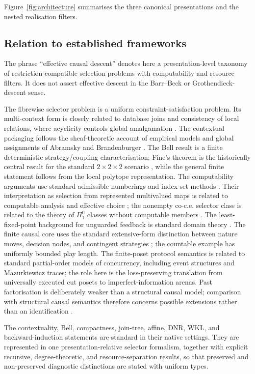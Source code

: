 \documentclass[11pt]{article}
\theoremstyle{plain}
\theoremstyle{definition}
\theoremstyle{remark}
\begin{document}
Figure~\ref{fig:architecture} summarises the three canonical presentations and the nested realisation filters.

\subsection*{Relation to established frameworks}

The phrase ``effective causal descent'' denotes here a presentation-level
taxonomy of restriction-compatible selection problems with computability and
resource filters. It does not assert effective descent in the Barr--Beck or
Grothendieck-descent sense.

The fibrewise selector problem is a uniform constraint-satisfaction problem. Its
multi-context form is closely related to database joins and consistency of local
relations, where acyclicity controls global amalgamation
\cite{beerifagin}. The contextual packaging follows the sheaf-theoretic account
of empirical models and global assignments of Abramsky and Brandenburger
\cite{abramsky}. The Bell result is a finite deterministic-strategy/coupling
characterisation; Fine's theorem is the historically central result for the
standard $2\times2\times2$ scenario \cite{fine}, while the general finite
statement follows from the local polytope representation. The computability
arguments use standard admissible numberings and index-set methods
\cite{kleene,rogers,soare}. Their interpretation as selection from represented
multivalued maps is related to computable analysis and effective choice
\cite{weihrauch}; the nonempty co-c.e. selector class is related to the theory
of $\Pi^0_1$ classes without computable members \cite{jockuschsoare}. The least-fixed-point background for unguarded feedback is
standard domain theory \cite{abramskyjung}. The finite causal core uses the
standard extensive-form distinction between nature moves, decision nodes, and
contingent strategies \cite{osbornerubinstein}; the countable example has
uniformly bounded play length. The finite-poset protocol semantics is related to
standard partial-order models of concurrency, including event structures and
Mazurkiewicz traces; the role here is the loss-preserving translation from
universally executed cut posets to imperfect-information arenas. Past factorisation is deliberately
weaker than a structural causal model; comparison with structural causal
semantics therefore concerns possible extensions rather than an identification
\cite{pearl}.

The contextuality, Bell, compactness, join-tree, affine, DNR, WKL, and
backward-induction statements are standard in their native settings. They are
represented in one presentation-relative selector formalism, together with
explicit recursive, degree-theoretic, and resource-separation results, so that
preserved and non-preserved diagnostic distinctions are stated with uniform
types.
\end{document}

